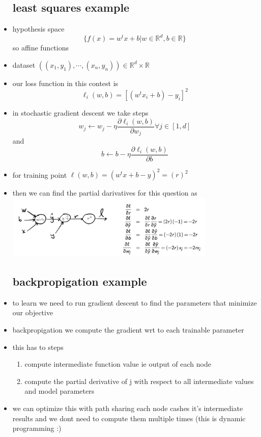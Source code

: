 \documentclass{article}
\begin{document}
\begin{itemize}
\subsection*{least squares example}
\item hypothesis space $$\{f(x)=w^{t}x+b|w\in \mathbb{R}^{d}, b\in \mathbb{R}\}$$ so affine functions 
\item dataset $((x_1,y_1),\cdots ,(x_n,y_n))\in \mathbb{R}^{d}\times \mathbb{R}$
\item our loss function in this contest is $$\ell_{i}(w,b)=[(w^{t}x_i+b)-y_i]^{2}$$
\item in stochastic gradient descent we  take steps $$w_{j}\leftarrow w_{j}-\eta \frac{\partial \ell_{i}(w,b)}{\partial w_j}\forall j\in [1,d]$$ and $$b\leftarrow b-\eta\frac{\partial \ell_{i}(w,b)}{\partial b}$$
\item for training point $\ell(w,b)=(w^{t}x+b-y)^{2}=(r)^{2}$
\item then we can find the partial darivatives for this question as \includegraphics*[width=10cm]{images/Screenshot 2023-05-15 at 1.20.38 AM.png}
\subsection*{backpropigation example}
\item to learn we need to run gradient descent to find the parameters that minimize our objective
\item backpropigation we compute the gradient wrt to each trainable parameter
\item this has to steps
\begin{enumerate}
    \item compute intermediate function value ie output of each node
    \item compute the partial derivative of j with respect to all intermediate values and model parameters
\end{enumerate}
\item we can optimize this with path sharing each node cashes it's intermediate results and we dont need to compute them multiple times (this is dynamic programming :)

\end{itemize}
\end{document}
